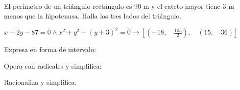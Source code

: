 \documentclass[addpoints,spanish, 12pt,a4paper]{exam}
\begin{document}
\begin{questions}




\question[2] El perímetro de un triángulo rectángulo es 90 m y el cateto mayor tiene 3 m menos que la hipotenusa. Halla los tres lados del triángulo.
\addpoints %


\begin{solution}
 	$x + 2 y - 87 = 0\land x^{2} + y^{2} - \left(y + 3\right)^{2} = 0\to \left [ \left ( -18, \quad \frac{105}{2}\right ), \quad \left ( 15, \quad 36\right )\right ]$ 
\end{solution}




\question Expresa en forma de intervalo:

\begin{parts}
\part[1] $\left| {x +3 } \right|\geqslant 1$
\begin{solution}
$\left(-\infty, -4\right] \cup \left[-2, \infty\right) $
\end{solution}
\end{parts}

\addpoints


\question Opera con radicales y simplifica:

\addpoints

\question Racionaliza y simplifica:
\end{questions}
\end{document}
